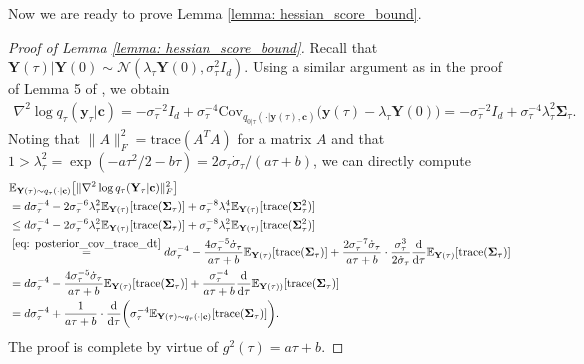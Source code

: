 \documentclass[11pt]{article}
\newcommand{\mE}{\mathbb{E}}
\newcommand{\bY}{\mathbf{Y}}
\newcommand{\by}{\mathbf{y}}
\newcommand{\bc}{\mathbf{c}}
\newcommand{\bSimga}{\boldsymbol{\Sigma}}
\newcommand{\cov}{{\text{Cov}}}
\newcommand{\intd}{\mathrm{d}}
\begin{document}
Now we are ready to prove Lemma \ref{lemma: hessian_score_bound}.
\begin{proof}[Proof of Lemma \ref{lemma: hessian_score_bound}]
Recall that $\bY(\tau) | \bY(0)\sim\mathcal{N}(\lambda_\tau\bY(0), \sigma_\tau^2I_d)$. Using a similar argument as in the proof of Lemma 5 of \cite{bentonnearly}, we obtain
\begin{align*}
    \nabla^2\log q_\tau(\by_\tau|\bc) = -\sigma_\tau^{-2}I_d + \sigma_\tau^{-4}\cov_{q_{0|\tau}(\cdot | \by(\tau), \bc)}\big(\by(\tau) - \lambda_\tau\bY(0)\big) = -\sigma_\tau^{-2}I_d + \sigma_\tau^{-4}\lambda_\tau^2\bSimga_\tau.
\end{align*}
Noting that $\|A\|_F^2 = \text{trace}(A^TA)$ for a matrix $A$ and that $1 > \lambda_\tau^2 = \exp(-a\tau^2/2 - b\tau) = 2\sigma_\tau\dot\sigma_\tau/(a\tau + b)$, we can directly compute
\begin{align*}
    &\mE_{\bY(\tau)\sim q_\tau(\cdot | \bc)}\big[\|\nabla^2\log q_\tau(\bY_\tau|\bc)\|_F^2\big] \\
    &= d\sigma_\tau^{-4} - 2\sigma_\tau^{-6}\lambda_\tau^2\mE_{\bY(\tau)}[\text{trace}(\bSimga_\tau)] + \sigma_\tau^{-8}\lambda_\tau^4\mE_{\bY(\tau)}[\text{trace}(\bSimga_\tau^2)]\\
    &\le d\sigma_\tau^{-4} - 2\sigma_\tau^{-6}\lambda_\tau^2\mE_{\bY(\tau)}[\text{trace}(\bSimga_\tau)] + \sigma_\tau^{-8}\lambda_\tau^2\mE_{\bY(\tau)}[\text{trace}(\bSimga_\tau^2)]\\
    &\overset{\eqref{eq: posterior_cov_trace_dt}}{=} d\sigma_\tau^{-4} - \frac{4\sigma_\tau^{-5}\dot\sigma_\tau}{a\tau + b}\mE_{\bY(\tau)}[\text{trace}(\bSimga_\tau)] + \frac{2\sigma_\tau^{-7}\dot\sigma_\tau}{a\tau + b}\cdot \frac{\sigma_\tau^3}{2\dot\sigma_\tau}\frac{\intd}{\intd\tau}\mE_{\bY(\tau)}[\text{trace}(\bSimga_\tau)]\\
    &= d\sigma_\tau^{-4} - \frac{4\sigma_\tau^{-5}\dot\sigma_\tau}{a\tau + b}\mE_{\bY(\tau)}[\text{trace}(\bSimga_\tau)] + \frac{\sigma_\tau^{-4}}{a\tau + b}\frac{\intd}{\intd\tau}\mE_{\bY(\tau))}[\text{trace}(\bSimga_\tau)]\\
    &= d\sigma_\tau^{-4} + \frac{1}{a\tau + b}\cdot \frac{\intd}{\intd\tau}\bigg(\sigma_\tau^{-4}\mE_{\bY(\tau)\sim q_\tau(\cdot | \bc)}[\text{trace}(\bSimga_\tau)]\bigg).
\end{align*}
The proof is complete by virtue of $g^2(\tau) = a\tau + b$.
\end{proof}
\end{document}
